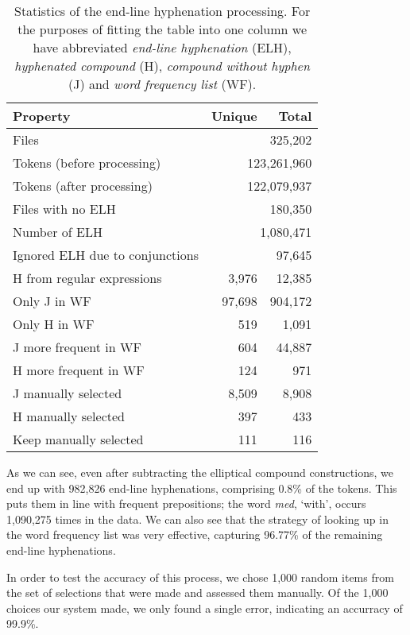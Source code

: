 \begin{table}[ht!]
\begin{center}
\begin{tabular}{|l|r|r|}
\hline \textbf{Property} & \textbf{Unique} & \textbf{Total} \\ \hline
Files & \multicolumn{2}{r|}{325,202} \\
Tokens (before processing) & \multicolumn{2}{r|}{123,261,960} \\
Tokens (after processing) & \multicolumn{2}{r|}{122,079,937} \\
Files with no ELH & \multicolumn{2}{r|}{180,350} \\
Number of ELH & \multicolumn{2}{r|}{1,080,471} \\
Ignored ELH due to conjunctions & \multicolumn{2}{r|}{97,645} \\ \hline
H from regular expressions & 3,976 & 12,385 \\
Only J in WF & 97,698 & 904,172 \\
Only H in WF & 519 & 1,091 \\
J more frequent in WF & 604 & 44,887 \\
H more frequent in WF & 124 & 971 \\
J manually selected & 8,509 & 8,908 \\
H manually selected & 397 & 433 \\
Keep manually selected & 111 & 116 \\
\hline
\end{tabular}
\end{center}
\caption{\label{stats-table} Statistics of the end-line hyphenation processing.
For the purposes of fitting the table into one column we have abbreviated \emph{end-line hyphenation} (ELH), \emph{hyphenated compound} (H), \emph{compound without hyphen} (J) and \emph{word frequency list} (WF).}
\end{table}

As we can see, even after subtracting the elliptical compound constructions, we end up with 982,826 end-line hyphenations, comprising 0.8\% of the tokens. This puts them in line with frequent prepositions; the word \emph{med}, `with', occurs 1,090,275 times in the data. We can also see that the strategy of looking up in the word frequency list was very effective, capturing 96.77\% of the remaining end-line hyphenations. 

In order to test the accuracy of this process, we chose 1,000 random items from the set of selections that were made and assessed them manually. Of the 1,000 choices our system made, we only found a single error, indicating an accurracy of 99.9\%.

